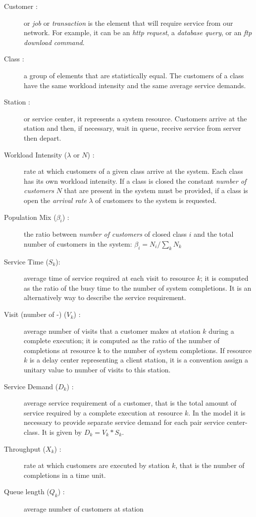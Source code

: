 \begin{description}
\item[Customer :] or \emph{job} or \emph{transaction} is the element that will require
service from our network. For example, it can be an \emph{http
request}, a \emph{database query}, or an \emph{ftp download
command}.
\item[Class :] a group of elements that are statistically equal.
The customers of a class have the same workload intensity and the
same average service demands.
\item[Station :] or service center, it represents a system resource.
Customers arrive at the station and then, if necessary, wait in
queue, receive service from server then depart.
\item[Workload Intensity ($\lambda$ or $N$) :] rate at which customers of a
given class arrive at the system.  Each class has its own workload
intensity. If a class is closed the constant \emph{number of
customers} $N$ that are present in the system must be provided, if a
class is open the \emph{arrival rate} $\lambda$ of customers to the
system is requested.
\item[Population Mix ($\beta_i$) :] the ratio between \emph{number of
customers} of closed class $i$ and the total number of customers in
the system: $\beta_i = N_i / \sum_k N_k$
\item[Service Time ($S_k$):] average time of service required at
each visit to resource $k$; it is computed as the ratio of the busy
time to the number of system completions. It is an alternatively way
to describe the service requirement.
\item[Visit (number of -) ($V_k$) :] average number of visits that
a customer makes at station $k$ during a complete execution; it is
computed as the ratio of the number of completions at resource k to
the number of system completions. If resource $k$ is a delay center
representing a client station, it is a convention assign a unitary
value to number of visits to this station.
\item[Service Demand ($D_k$) :] average service requirement of
a customer, that is the total amount of service required  by a
complete execution at resource $k$. In the model it is necessary to
provide separate service demand for each pair service center-class.
It is given by $D_k = V_k * S_k$.
\item[Throughput ($X_k$) :] rate at which customers are executed
by station $k$, that is the number of completions in a time unit.
\item[Queue length ($Q_k$) :] average number of customers at station

\end{description}
